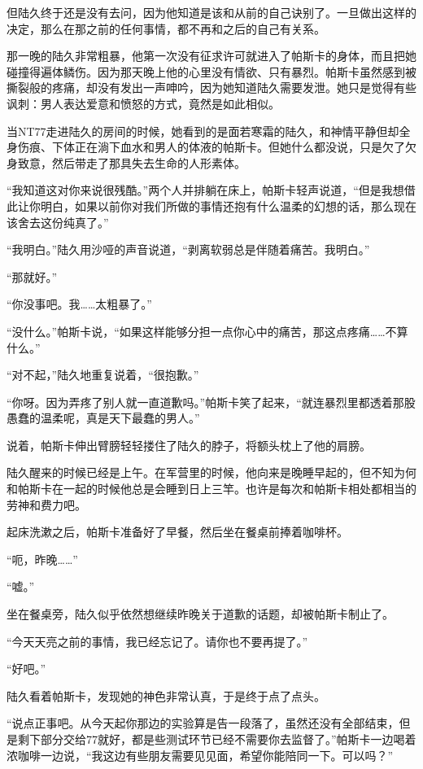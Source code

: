 但陆久终于还是没有去问，因为他知道是该和从前的自己诀别了。一旦做出这样的决定，那么在那之前的任何事情，都不再和之后的自己有关系。

那一晚的陆久非常粗暴，他第一次没有征求许可就进入了帕斯卡的身体，而且把她碰撞得遍体鳞伤。因为那天晚上他的心里没有情欲、只有暴烈。帕斯卡虽然感到被撕裂般的疼痛，却没有发出一声呻吟，因为她知道陆久需要发泄。她只是觉得有些讽刺：男人表达爱意和愤怒的方式，竟然是如此相似。

当NT77走进陆久的房间的时候，她看到的是面若寒霜的陆久，和神情平静但却全身伤痕、下体正在淌下血水和男人的体液的帕斯卡。但她什么都没说，只是欠了欠身致意，然后带走了那具失去生命的人形素体。

“我知道这对你来说很残酷。”两个人并排躺在床上，帕斯卡轻声说道，“但是我想借此让你明白，如果以前你对我们所做的事情还抱有什么温柔的幻想的话，那么现在该舍去这份纯真了。”

“我明白。”陆久用沙哑的声音说道，“剥离软弱总是伴随着痛苦。我明白。”

“那就好。”

“你没事吧。我……太粗暴了。”

“没什么。”帕斯卡说，“如果这样能够分担一点你心中的痛苦，那这点疼痛……不算什么。”

“对不起，”陆久地重复说着，“很抱歉。”

“你呀。因为弄疼了别人就一直道歉吗。”帕斯卡笑了起来，“就连暴烈里都透着那股愚蠢的温柔呢，真是天下最蠢的男人。”

说着，帕斯卡伸出臂膀轻轻搂住了陆久的脖子，将额头枕上了他的肩膀。

陆久醒来的时候已经是上午。在军营里的时候，他向来是晚睡早起的，但不知为何和帕斯卡在一起的时候他总是会睡到日上三竿。也许是每次和帕斯卡相处都相当的劳神和费力吧。

起床洗漱之后，帕斯卡准备好了早餐，然后坐在餐桌前捧着咖啡杯。

“呃，昨晚……”

“嘘。”

坐在餐桌旁，陆久似乎依然想继续昨晚关于道歉的话题，却被帕斯卡制止了。

“今天天亮之前的事情，我已经忘记了。请你也不要再提了。”

“好吧。”

陆久看着帕斯卡，发现她的神色非常认真，于是终于点了点头。

“说点正事吧。从今天起你那边的实验算是告一段落了，虽然还没有全部结束，但是剩下部分交给77就好，都是些测试环节已经不需要你去监督了。”帕斯卡一边喝着浓咖啡一边说，“我这边有些朋友需要见见面，希望你能陪同一下。可以吗？”

